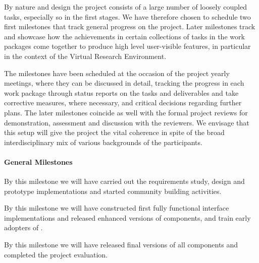 

By nature and design the project consists of a large number of loosely
coupled tasks, especially so in the first stages. We have therefore
chosen to schedule two first milestones that track general progress on
the project. Later milestones track and showcase how the achievements
in certain collections of tasks in the work packages come together to
produce high level user-visible features, in particular in the context
of the Virtual Research Environment.

The milestones have been scheduled at the occasion of the project
yearly meetings, where they can be discussed in detail, tracking the
progress in each work package through status reports on the tasks and
deliverables and take corrective measures, where necessary, and
critical decisions regarding further plans. The later milestones
coincide as well with the formal project reviews for demonstration,
assessment and discussion with the reviewers.
%
We envisage that this
setup will give the project the vital coherence in spite of the broad
interdisciplinary mix of various backgrounds of the participants.

\paragraph{General Milestones}

\begin{milestones}
  {By this milestone we will have carried out the requirements study, design and prototype implementations and started community building activities.}

  {By this milestone we will have constructed first fully functional interface implementations and released enhanced versions of \TheProject components, and train early adopters of \TheProject.}


  {By this milestone we will have released final versions of all \TheProject components and completed the project evaluation.}
\end{milestones}

